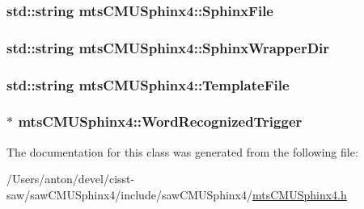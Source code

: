 \subsubsection[{Sphinx\+File}]{\setlength{\rightskip}{0pt plus 5cm}std\+::string mts\+C\+M\+U\+Sphinx4\+::\+Sphinx\+File}\label{classmts_c_m_u_sphinx4_a7bd334f3fc83a2e02835b04c3aa97429}
\hypertarget{classmts_c_m_u_sphinx4_a27347a99b66802545ec6c64aa85aebb3}{}
\subsubsection[{Sphinx\+Wrapper\+Dir}]{\setlength{\rightskip}{0pt plus 5cm}std\+::string mts\+C\+M\+U\+Sphinx4\+::\+Sphinx\+Wrapper\+Dir}\label{classmts_c_m_u_sphinx4_a27347a99b66802545ec6c64aa85aebb3}
\hypertarget{classmts_c_m_u_sphinx4_af225e6118d17b5bd9d325a0876d7b2a2}{}
\subsubsection[{Template\+File}]{\setlength{\rightskip}{0pt plus 5cm}std\+::string mts\+C\+M\+U\+Sphinx4\+::\+Template\+File}\label{classmts_c_m_u_sphinx4_af225e6118d17b5bd9d325a0876d7b2a2}
\hypertarget{classmts_c_m_u_sphinx4_a7a05ef0831adccfb72bebfcb22bbfd3b}{}
\subsubsection[{Word\+Recognized\+Trigger}]{$\ast$ mts\+C\+M\+U\+Sphinx4\+::\+Word\+Recognized\+Trigger}\label{classmts_c_m_u_sphinx4_a7a05ef0831adccfb72bebfcb22bbfd3b}


The documentation for this class was generated from the following file\+:\begin{DoxyCompactItemize}
\item 
/\+Users/anton/devel/cisst-\/saw/saw\+C\+M\+U\+Sphinx4/include/saw\+C\+M\+U\+Sphinx4/\hyperlink{mts_c_m_u_sphinx4_8h}{mts\+C\+M\+U\+Sphinx4.\+h}\end{DoxyCompactItemize}

